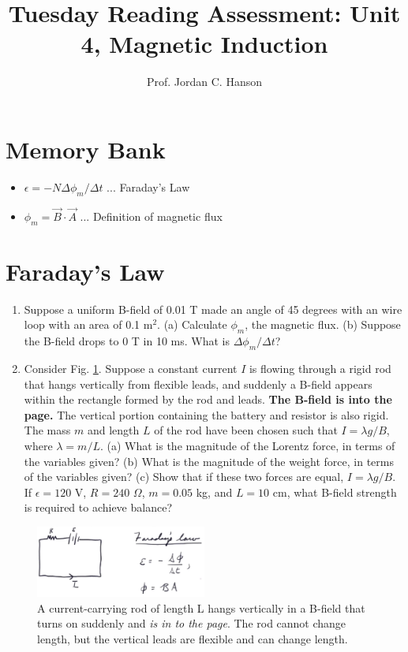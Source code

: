 \documentclass{article}
\begin{document}
\title{Tuesday Reading Assessment: Unit 4, Magnetic Induction}
\author{Prof. Jordan C. Hanson}

\maketitle

\section{Memory Bank}

\begin{itemize}
\item $\epsilon = -N \Delta \phi_m /\Delta t$ ... Faraday's Law
\item $\phi_m = \vec{B} \cdot \vec{A}$ ... Definition of magnetic flux
\end{itemize}

\section{Faraday's Law}

\begin{enumerate}
\item Suppose a uniform B-field of 0.01 T made an angle of 45 degrees with an wire loop with an area of 0.1 m$^2$.  (a) Calculate $\phi_m$, the magnetic flux. (b) Suppose the B-field drops to 0 T in 10 ms.  What is $\Delta \phi_m / \Delta t$? \\ \vspace{2cm}
\item Consider Fig. \ref{fig:current}.  Suppose a constant current $I$ is flowing through a rigid rod that hangs vertically from flexible leads, and suddenly a B-field appears within the rectangle formed by the rod and leads.  \textbf{The B-field is into the page.}  The vertical portion containing the battery and resistor is also rigid.  The mass $m$ and length $L$ of the rod have been chosen such that $I = \lambda g / B$, where $\lambda = m/L$.  (a) What is the magnitude of the Lorentz force, in terms of the variables given?  (b) What is the magnitude of the weight force, in terms of the variables given?  (c)  Show that if these two forces are equal, $I = \lambda g / B$. If $\epsilon = 120$ V, $R=240$ $\Omega$, $m = 0.05$ kg, and $L = 10$ cm, what B-field strength is required to achieve balance? 
\end{enumerate}
\begin{figure}
\centering
\includegraphics[width=0.5\textwidth]{current.png}
\caption{\label{fig:current} A current-carrying rod of length L hangs vertically in a B-field that turns on suddenly and \textit{is in to the page}.  The rod cannot change length, but the vertical leads are flexible and can change length.}
\end{figure}
\end{document}

